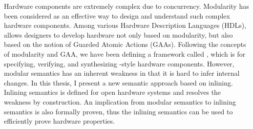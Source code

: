 % 
% 
%

Hardware components are extremely complex due to concurrency.
Modularity has been considered as an effective way to design and
understand such complex hardware components. Among various Hardware
Description Languages (HDLs), \Bluespec{} allows designers to develop
hardware not only based on modularity, but also based on the notion of
Guarded Atomic Actions (GAAs). Following the concepts of modularity
and GAA, we have been defining a framework called \Kami{}, which is
for specifying, verifying, and synthesizing \Bluespec{}-style hardware
components. However, modular semantics has an inherent weakness in
that it is hard to infer internal changes. In this thesis, I present a
new semantic approach based on inlining. Inlining semantics is defined
for open hardware systems and resolves the weakness by construction.
An implication from modular semantics to inlining semantics is also
formally proven, thus the inlining semantics can be used to
efficiently prove hardware properties.


